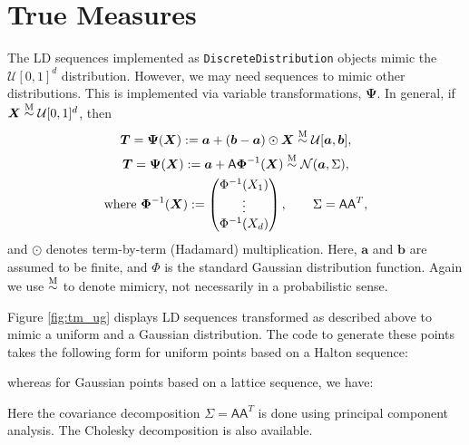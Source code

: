 \documentclass[graybox]{svmult}
\begin{document}
\section{True Measures}

The LD sequences implemented as \texttt{DiscreteDistribution} objects mimic the $\mathcal{U}[0,1]^d$ distribution.  However, we may need sequences to mimic other distributions.  This is implemented via variable transformations, $\boldsymbol{\Psi}$.  In general, if $\boldsymbol{X} \overset{\textup{M}}{\sim} \mathcal{U}[0,1]^d$, then
\begin{subequations} \label{eq:exampleVarTrans}
\begin{gather}
\boldsymbol{T} = \boldsymbol{\Psi}(\boldsymbol{X}) := \boldsymbol{a}  + (\boldsymbol{b} - \boldsymbol{a}) \odot \boldsymbol{X} \overset{\textup{M}}{\sim}  \mathcal{U}[\boldsymbol{a},\boldsymbol{b}], \\
\label{eq:exampleVarTransGauss}
\boldsymbol{T} = \boldsymbol{\Psi}(\boldsymbol{X}) := \boldsymbol{a} + \mathsf{A} \boldsymbol{\Phi}^{-1}(\boldsymbol{X})  \overset{\textup{M}}{\sim} \mathcal{N}(\boldsymbol{a}, \Sigma), \\
\nonumber  \text{where }  \boldsymbol{\Phi}^{-1}(\boldsymbol{X}) : = \begin{pmatrix} \Phi^{-1}(X_1) \\ \vdots \\ \Phi^{-1}(X_d)\end{pmatrix}, \qquad \Sigma = \mathsf{A} \mathsf{A}^T,
\end{gather}
\end{subequations}
and $\odot$ denotes term-by-term (Hadamard) multiplication.  Here, $\boldsymbol{a}$ and $\boldsymbol{b}$ are assumed to be finite, and $\Phi$ is the standard Gaussian distribution function.  Again we use $\overset{\textup{M}}{\sim}$ to denote mimicry, not necessarily in a probabilistic sense.

Figure \ref{fig:tm_ug} displays LD sequences transformed as described above to mimic a uniform and a Gaussian distribution.  The code to generate these points takes the following form for uniform points based on a Halton sequence: 

whereas for Gaussian points based on a lattice sequence, we have:

Here the covariance decomposition $\Sigma = \mathsf{A} \mathsf{A}^T$ is done using principal component analysis. The Cholesky decomposition is also available.
\end{document}
